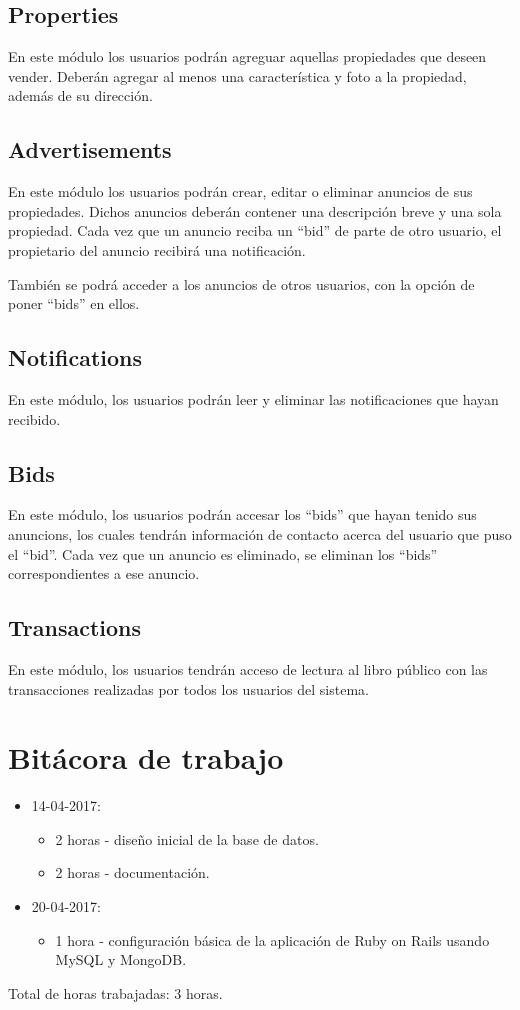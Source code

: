 \documentclass{article}
\begin{document}
\subsection{Properties}
En este m\'odulo los usuarios podr\'an agreguar aquellas propiedades que deseen vender. Deber\'an agregar al menos una caracter\'istica y foto a la propiedad, adem\'as de su direcci\'on.

\subsection{Advertisements}
En este m\'odulo los usuarios podr\'an crear, editar o eliminar anuncios de sus propiedades. Dichos anuncios deber\'an contener una descripci\'on breve y una sola propiedad. Cada vez que un anuncio reciba un ``bid'' de parte de otro usuario, el propietario del anuncio recibir\'a una notificaci\'on.

Tambi\'en se podr\'a acceder a los anuncios de otros usuarios, con la opci\'on de poner ``bids'' en ellos.

\subsection{Notifications}
En este m\'odulo, los usuarios podr\'an leer y eliminar las notificaciones que hayan recibido.

\subsection{Bids}
En este m\'odulo, los usuarios podr\'an accesar los ``bids'' que hayan tenido sus anuncions, los cuales tendr\'an informaci\'on de contacto acerca del usuario que puso el ``bid''. Cada vez que un anuncio es eliminado, se eliminan los ``bids'' correspondientes a ese anuncio.

\subsection{Transactions}
En este m\'odulo, los usuarios tendr\'an acceso de lectura al libro p\'ublico con las transacciones realizadas por todos los usuarios del sistema.

\section{Bit\'acora de trabajo}
\begin{itemize}
  \item 14-04-2017:
  \begin{itemize}
    \item 2 horas - dise\~no inicial de la base de datos.
    \item 2 horas - documentaci\'on.
  \end{itemize}
  \item 20-04-2017:
  \begin{itemize}
    \item 1 hora - configuraci\'on b\'asica de la aplicaci\'on de Ruby on Rails usando MySQL y MongoDB.
  \end{itemize}
\end{itemize}
Total de horas trabajadas: 3 horas.
\end{document}
